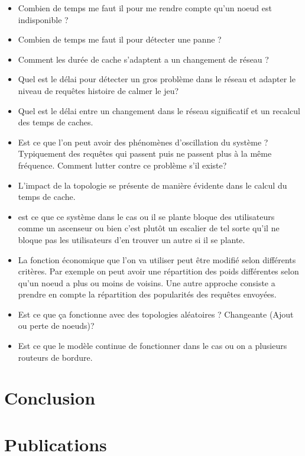 \begin{itemize}
	\item Combien de temps me faut il pour me rendre compte qu'un noeud est indisponible ?
	\item Combien de temps me faut il pour détecter une panne ?
	\item Comment les durée de cache s'adaptent a un changement de réseau ?
	\item Quel est le délai pour détecter un gros problème dans le réseau et adapter le niveau de requêtes histoire de calmer le jeu?
	\item Quel est le délai entre un changement dans le réseau significatif et un recalcul des temps de caches.
	\item Est ce que l'on peut avoir des phénomènes d'oscillation du système ? Typiquement des requêtes qui passent puis ne passent plus à la même fréquence. Comment lutter contre ce problème s'il existe?
	\item L'impact de la topologie se présente de manière évidente dans le calcul du temps de cache.

	\item est ce que ce système dans le cas ou il se plante bloque des utilisateurs comme 
	un ascenseur ou bien c'est plutôt un escalier de tel sorte qu'il ne bloque pas les utilisateurs d'en trouver un autre si il se plante.

	\item La fonction économique que l'on va utiliser peut être modifié selon différents critères. Par exemple on peut avoir une répartition des poids différentes selon qu'un noeud a plus ou moins de voisins. Une autre approche consiste a prendre en compte la répartition des popularités des requêtes envoyées.

	\item Est ce que ça fonctionne avec des topologies aléatoires ? Changeante (Ajout ou perte de noeuds)?

	\item Est ce que le modèle continue de fonctionner dans le cas ou on a plusieurs routeurs de bordure.	

\end{itemize}



\section{Conclusion} %
\label{sec:cache_conclusion}

\lipsum


\section{Publications} %
\label{sec:cache_publications}


